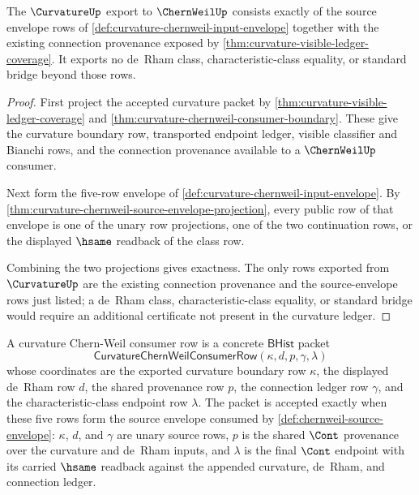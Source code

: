 \begin{theorem}
\label{thm:curvature-chernweil-consumer-exactness}
The $\CurvatureUp$ export to $\ChernWeilUp$ consists exactly of the source envelope rows of \autoref{def:curvature-chernweil-input-envelope} together with the existing connection provenance exposed by \autoref{thm:curvature-visible-ledger-coverage}. It exports no de~Rham class, characteristic-class equality, or standard bridge beyond those rows.
\end{theorem}
\begin{proof}
First project the accepted curvature packet by \autoref{thm:curvature-visible-ledger-coverage} and \autoref{thm:curvature-chernweil-consumer-boundary}. These give the curvature boundary row, transported endpoint ledger, visible classifier and Bianchi rows, and the connection provenance available to a $\ChernWeilUp$ consumer.

Next form the five-row envelope of \autoref{def:curvature-chernweil-input-envelope}. By \autoref{thm:curvature-chernweil-source-envelope-projection}, every public row of that envelope is one of the unary row projections, one of the two continuation rows, or the displayed $\hsame$ readback of the class row.

Combining the two projections gives exactness. The only rows exported from $\CurvatureUp$ are the existing connection provenance and the source-envelope rows just listed; a de~Rham class, characteristic-class equality, or standard bridge would require an additional certificate not present in the curvature ledger.
\end{proof}

\begin{definition}
\label{def:curvature-chernweil-consumer-row}
A curvature Chern-Weil consumer row is a concrete $\mathsf{BHist}$ packet
$$
\mathsf{CurvatureChernWeilConsumerRow}(\kappa,d,p,\gamma,\lambda)
$$
whose coordinates are the exported curvature boundary row $\kappa$, the displayed de~Rham row $d$, the shared provenance row $p$, the connection ledger row $\gamma$, and the characteristic-class endpoint row $\lambda$. The packet is accepted exactly when these five rows form the source envelope consumed by \autoref{def:chernweil-source-envelope}: $\kappa$, $d$, and $\gamma$ are unary source rows, $p$ is the shared $\Cont$ provenance over the curvature and de~Rham inputs, and $\lambda$ is the final $\Cont$ endpoint with its carried $\hsame$ readback against the appended curvature, de~Rham, and connection ledger.
\end{definition}

